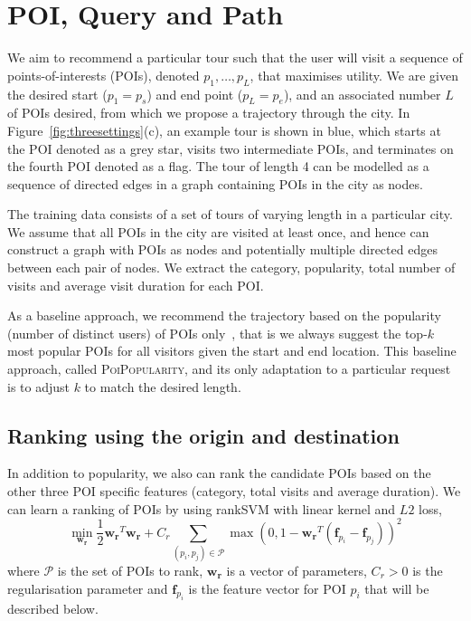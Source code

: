 \section{POI, Query and Path}
\label{sec:method}


We aim to recommend a particular tour such that the user will visit a sequence of points-of-interests (POIs), denoted $p_1, \ldots, p_L$, that maximises utility. We are given the desired start ($p_1=p_s$) and end point ($p_L=p_e$), and an associated number $L$ of POIs desired, from which we propose a trajectory through the city. In Figure~\ref{fig:threesettings}(c), an example tour is shown in blue, which starts at the POI denoted as a grey star, visits two intermediate POIs, and terminates on the fourth POI denoted as a flag. The tour of length 4 can be modelled as a sequence of directed edges in a graph containing POIs in the city as nodes.

The training data consists of a set of tours of varying length in a particular city. We assume that all POIs in the city are visited at least once, and hence can construct a graph with POIs as nodes and potentially multiple directed edges between each pair of nodes. We extract the category, popularity, total number of visits and average visit duration for each POI.

As a baseline approach, we recommend the trajectory based on the popularity (number of distinct users) of POIs only~\cite{ht10}, that is we always suggest the top-$k$ most popular POIs for all visitors given the start and end location. This baseline approach, called \textsc{PoiPopularity}, and its only adaptation to a particular request is to adjust $k$ to match the desired length.

\subsection{Ranking using the origin and destination}
\label{sec:ranksvm}

In addition to popularity, we also can rank the candidate POIs based on the other three POI specific features (category, total visits and average duration).
We can learn a ranking of POIs by using rankSVM with linear kernel and $L2$ loss\cite{lranksvm},
\begin{displaymath}
\min_{\mathbf{w_r}} \frac{1}{2} \mathbf{w_r}^T \mathbf{w_r} +
                    C_r \sum_{(p_i, p_j) \in \mathcal{P}}
                    \max \left( 0, 1 - \mathbf{w_r}^T (\mathbf{f}_{p_i} - \mathbf{f}_{p_j}) \right)^2
\end{displaymath}
where $\mathcal{P}$ is the set of POIs to rank,
$\mathbf{w_r}$ is a vector of parameters,
$C_r > 0$ is the regularisation parameter and
$\mathbf{f}_{p_i}$ is the feature vector for POI $p_i$ that will be described below.

